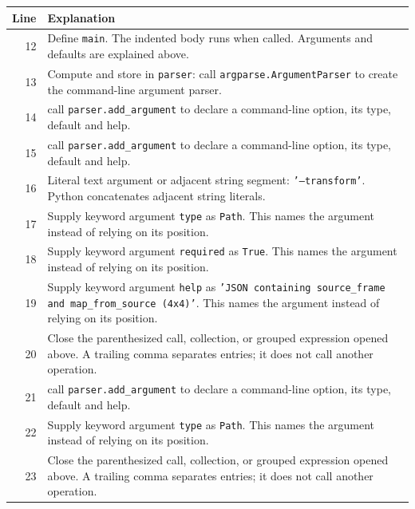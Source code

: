 \documentclass[11pt,a4paper]{book}
\begin{document}
\begin{longtable}{r p{}}

\textbf{Line} & \textbf{Explanation} \\ \hline \endhead

12 & Define \texttt{main}. The indented body runs when called. Arguments and defaults are explained above. \\

13 & Compute and store in \texttt{parser}: call \texttt{argparse.ArgumentParser} to create the command-line argument parser.  \\

14 & call \texttt{parser.add\_argument} to declare a command-line option, its type, default and help. \\

15 & call \texttt{parser.add\_argument} to declare a command-line option, its type, default and help. \\

16 & Literal text argument or adjacent string segment: \texttt{'--transform'}. Python concatenates adjacent string literals. \\

17 & Supply keyword argument \texttt{type} as \texttt{Path}. This names the argument instead of relying on its position. \\

18 & Supply keyword argument \texttt{required} as \texttt{True}. This names the argument instead of relying on its position. \\

19 & Supply keyword argument \texttt{help} as \texttt{'JSON containing source\_frame and map\_from\_source (4x4)'}. This names the argument instead of relying on its position. \\

20 & Close the parenthesized call, collection, or grouped expression opened above. A trailing comma separates entries; it does not call another operation. \\

21 & call \texttt{parser.add\_argument} to declare a command-line option, its type, default and help. \\

22 & Supply keyword argument \texttt{type} as \texttt{Path}. This names the argument instead of relying on its position. \\

23 & Close the parenthesized call, collection, or grouped expression opened above. A trailing comma separates entries; it does not call another operation. \\


\end{longtable}
\end{document}
